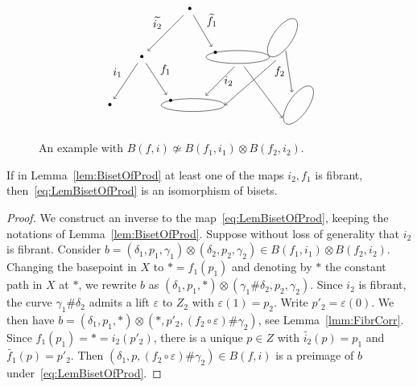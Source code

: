 \documentclass{amsart}
\begin{document}
\begin{figure}
\label{Fg:BadCorrProduct}
\[\begin{tikzpicture}[dot/.style={}]

\draw [rotate around={ 55:(0.5,1.1) }] (0.5,1.1) ellipse (0.7 and 0.3);
\draw  (-0.9,0.5) ellipse (0.99 and 0.2);
\draw  (-2.3,-1) ellipse (0.99 and 0.2);
\draw [rotate around={ 55:(1,-1) }] (1,-1) ellipse (0.7 and 0.3);

\draw[->] (0.6,0.7) -- node[left] {$f_2$} (0.8,-0.6);
\draw[->] (-0.7,0.2) -- (0.5,-1.4);

\draw[->] (-1,0.2) --  node[right] {$i_2$} (-1.9,-0.7);
\draw[->] (0.3,0.4) -- (-1.3,-1.0);

\node (a) at (-2.4,2) {\textbullet};
\node (b) at (-3.9,0.5) {\textbullet};
\node (c) at (-1.6,0.63) {\textbullet};
\node (d) at (-4.9,-1) {\textbullet};
\node (e) at (-3,-0.87) {\textbullet};

\draw[->] (a) -- node [above left] {$\widetilde{i_2}$} (b);
\draw[->] (a) -- node [above right] {$\widetilde{f_1}$} (c);
\draw[->] (b) -- node [above left] {$i_1$} (d);
\draw[->] (b) -- node [above right] {$f_1$} (e);

\end{tikzpicture}\]
\caption{An example with $B(f,i) \nsimeq B(f_1,i_1)\otimes
  B(f_2,i_2)$.}
\end{figure}

\begin{lem}\label{lem:BisetOfGoodProd} 
  If in Lemma~\ref{lem:BisetOfProd} at least one of the maps $i_2,f_1$
  is fibrant, then~\eqref{eq:LemBisetOfProd} is an isomorphism of
  bisets.
\end{lem}
\begin{proof}
  We construct an inverse to the map~\eqref{eq:LemBisetOfProd},
  keeping the notations of Lemma~\ref{lem:BisetOfProd}.  Suppose
  without loss of generality that $i_2$ is fibrant. Consider
  $b=(\delta_1,p_1,\gamma_1)\otimes(\delta_2,p_2,\gamma_2)\in
  B(f_1,i_1)\otimes B(f_2,i_2)$. Changing the basepoint in $X$ to
  $*=f_1(p_1)$ and denoting by $*$ the constant path in $X$ at $*$, we
  rewrite $b$ as
  $(\delta_1,p_1,*)\otimes(\gamma_1\#\delta_2,p_2,\gamma_2)$. Since
  $i_2$ is fibrant, the curve $\gamma_1\#\delta_2$ admits a lift
  $\varepsilon$ to $Z_2$ with $\varepsilon(1)=p_2$. Write
  $p'_2=\varepsilon(0)$. We then have $b=(\delta_1,p_1,*)\otimes
  (*,p'_2,(f_2\circ\varepsilon)\#\gamma_2)$, see
  Lemma~\ref{lmm:FibrCorr}. Since $f_1(p_1)=*=i_2(p'_2)$, there is a
  unique $p\in Z$ with $\widetilde{i_2}(p)=p_1$ and
  $\widetilde{f_1}(p)=p'_2$. Then
  $(\delta_1,p,(f_2\circ\varepsilon)\#\gamma_2)\in B(f,i)$ is a
  preimage of $b$ under~\eqref{eq:LemBisetOfProd}.
\end{proof}
\end{document}
